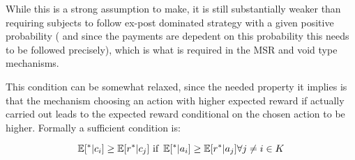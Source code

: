 While this is a strong assumption to make, it is still substantially weaker than requiring subjects to follow ex-post dominated strategy with a given positive probability ( and since the payments are depedent on this probability this needs to be followed precisely), which is what is required in the MSR and void type mechanisms.

This condition can be somewhat relaxed,  since the needed property it implies is that the mechanism choosing an action with higher expected reward if actually carried out leads to the expected reward conditional on the chosen action to be higher. Formally a sufficient condition is:

\[
\expec[ ^{*}|c_i]  \geq \expec[ r^{*}|c_j] \text{ if }\expec[ ^{*}|a_i]  \geq \expec[ r^{*}|a_j]  \forall j \neq i \in K
\]







